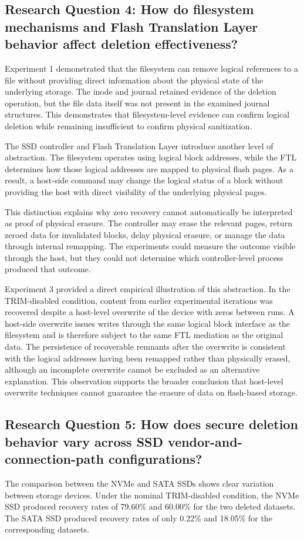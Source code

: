 \subsection*{Research Question 4: How do filesystem mechanisms and Flash Translation Layer behavior affect deletion effectiveness?}
Experiment 1 demonstrated that the filesystem can remove logical references to a file without providing direct information about the physical state of the underlying 
storage. The inode and journal retained evidence of the deletion operation, but the file data itself was not present in the examined journal structures. This 
demonstrates that filesystem-level evidence can confirm logical deletion while remaining insufficient to confirm physical sanitization. 

The SSD controller and Flash Translation Layer introduce another level of abstraction. The filesystem operates using logical block addresses, while the FTL determines 
how those logical addresses are mapped to physical flash pages. As a result, a host-side command may change the logical status of a block without providing the host 
with direct visibility of the underlying physical pages.

This distinction explains why zero recovery cannot automatically be interpreted as proof of physical erasure. The controller may erase the relevant pages, return 
zeroed data for invalidated blocks, delay physical erasure, or manage the data through internal remapping. The experiments could measure the outcome visible through 
the host, but they could not determine which controller-level process produced that outcome.

Experiment 3 provided a direct empirical illustration of this abstraction. In the TRIM-disabled condition, content from earlier experimental iterations was recovered 
despite a host-level overwrite of the device with zeros between runs. A host-side overwrite issues writes through the same logical block interface as the filesystem and 
is therefore subject to the same FTL mediation as the original data. The persistence of recoverable remnants after the overwrite is consistent with the logical 
addresses having been remapped rather than physically erased, although an incomplete overwrite cannot be excluded as an alternative explanation. This observation 
supports the broader conclusion that host-level overwrite techniques cannot guarantee the erasure of data on flash-based storage.

\subsection*{Research Question 5: How does secure deletion behavior vary across SSD vendor-and-connection-path configurations?}
The comparison between the NVMe and SATA SSDs shows clear variation between storage devices. Under the nominal TRIM-disabled condition, the NVMe SSD produced recovery 
rates of 79.60\% and 60.00\% for the two deleted datasets. The SATA SSD produced recovery rates of only 0.22\% and 18.05\% for the corresponding datasets. 

